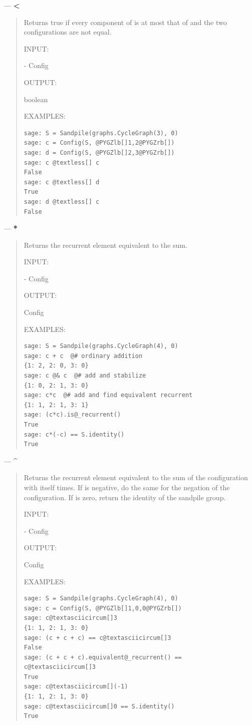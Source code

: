 \documentclass[letterpaper,10pt,english]{manual}
\begin{document}
---
\hypertarget{less}{}
\textbf{\textless{}}
\begin{quote}

Returns true if every component of  is at most that
of  and the two configurations are not equal.

INPUT:

 - Config

OUTPUT:

boolean

EXAMPLES:

\begin{Verbatim}[commandchars=@\[\]]
sage: S = Sandpile(graphs.CycleGraph(3), 0)
sage: c = Config(S, @PYGZlb[]1,2@PYGZrb[])
sage: d = Config(S, @PYGZlb[]2,3@PYGZrb[])
sage: c @textless[] c
False
sage: c @textless[] d
True
sage: d @textless[] c
False
\end{Verbatim}
\end{quote}

---
\hypertarget{mul}{}
\textbf{*}
\begin{quote}

Returns the recurrent element equivalent to the sum.

INPUT:

 - Config

OUTPUT:

Config

EXAMPLES:

\begin{Verbatim}[commandchars=@\[\]]
sage: S = Sandpile(graphs.CycleGraph(4), 0)
sage: c + c  @# ordinary addition
{1: 2, 2: 0, 3: 0}
sage: c @& c  @# add and stabilize
{1: 0, 2: 1, 3: 0}
sage: c*c  @# add and find equivalent recurrent
{1: 1, 2: 1, 3: 1}
sage: (c*c).is@_recurrent()
True
sage: c*(-c) == S.identity()
True
\end{Verbatim}
\end{quote}

---
\hypertarget{pow}{}
\textbf{\textasciicircum{}}
\begin{quote}

Returns the recurrent element equivalent to the sum of the
configuration with itself  times.  If  is negative, do the
same for the negation of the configuration.  If  is zero, return
the identity of the sandpile group.

INPUT:

 - Config

OUTPUT:

Config

EXAMPLES:

\begin{Verbatim}[commandchars=@\[\]]
sage: S = Sandpile(graphs.CycleGraph(4), 0)
sage: c = Config(S, @PYGZlb[]1,0,0@PYGZrb[])
sage: c@textasciicircum[]3
{1: 1, 2: 1, 3: 0}
sage: (c + c + c) == c@textasciicircum[]3
False
sage: (c + c + c).equivalent@_recurrent() == c@textasciicircum[]3
True
sage: c@textasciicircum[](-1)
{1: 1, 2: 1, 3: 0}
sage: c@textasciicircum[]0 == S.identity()
True
\end{Verbatim}
\end{quote}
\end{document}
